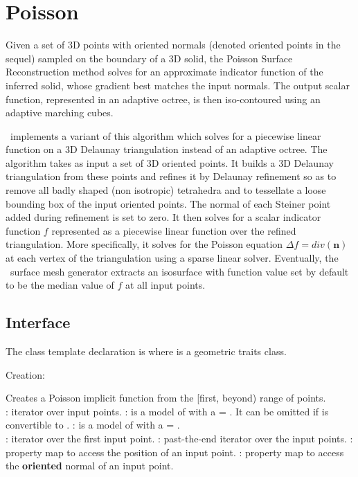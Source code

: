 \section{Poisson}

Given a set of 3D points with oriented normals (denoted oriented points in the sequel) sampled on the boundary of a 3D solid, the Poisson Surface Reconstruction method \cite{Kazhdan06} solves for an approximate indicator function of the inferred solid, whose gradient best matches the input normals. The output scalar function, represented in an adaptive octree, is then iso-contoured using an adaptive marching cubes.

\cgal\ implements a variant of this algorithm which solves for a piecewise linear function on a 3D Delaunay triangulation instead of an adaptive octree. The algorithm takes as input a set of 3D oriented points. It builds a 3D Delaunay triangulation from these points and refines it by Delaunay refinement so as to remove all badly shaped (non isotropic) tetrahedra and to tessellate a loose bounding box of the input oriented points. The normal of each Steiner point added during refinement is set to zero. It then solves for a scalar indicator function $f$ represented as a piecewise linear function over the refined triangulation. More specifically, it solves for the Poisson equation  $\Delta f = div(\mathbf{n})$ at each vertex of the triangulation using a sparse linear solver. Eventually, the \cgal\ surface mesh generator extracts an isosurface with function value set by default to be the median value of $f$ at all input points.

\subsection{Interface}

The class template declaration is  where 
 is a geometric traits class.

Creation:


{
Creates a Poisson implicit function from the [first, beyond) range of points.
  \\
: iterator over input points. : is a model of  with a  = . It can be omitted if   is convertible to . : is a model of  with a  = .
  \\
: iterator over the first input point. : past-the-end iterator over the input points. : property map to access the position of an input point. : property map to access the {\bf oriented} normal of an input point.
}

